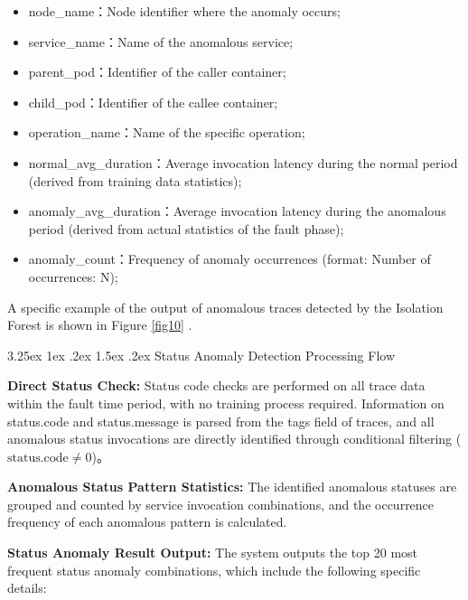 \documentclass[10pt]{article}
\makeatletter
\let\oldref\ref
\renewcommand{\ref}[1]{%
    \textcolor{blue}{\oldref{#1}}%
}
\renewcommand{\paragraph}{%
    \@startsection{paragraph}{4}{\z@}%
    {3.25ex \@plus1ex \@minus.2ex}%
    {1.5ex \@plus.2ex}%
    {\normalfont\normalsize\itshape}%
}
\makeatother
\begin{document}
\begin{itemize}
    \item node\_name：Node identifier where the anomaly occurs;
    \item service\_name：Name of the anomalous service;
    \item parent\_pod：Identifier of the caller container;
    \item child\_pod：Identifier of the callee container;
    \item operation\_name：Name of the specific operation;
    \item normal\_avg\_duration：Average invocation latency during the normal period (derived from training data statistics);
    \item anomaly\_avg\_duration：Average invocation latency during the anomalous period (derived from actual statistics of the fault phase);
    \item anomaly\_count：Frequency of anomaly occurrences (format: Number of occurrences: N);
\end{itemize}

A specific example of the output of anomalous traces detected by the Isolation Forest is shown in Figure \ref{fig10}.

\paragraph{Status Anomaly Detection Processing Flow}

\textbf{Direct Status Check:} Status code checks are performed on all trace data within the fault time period, with no training process required. Information on status.code and status.message is parsed from the tags field of traces, and all anomalous status invocations are directly identified through conditional filtering (\( \text{status.code} \neq 0 \))。

\textbf{Anomalous Status Pattern Statistics:} The identified anomalous statuses are grouped and counted by service invocation combinations, and the occurrence frequency of each anomalous pattern is calculated.

\textbf{Status Anomaly Result Output:} The system outputs the top 20 most frequent status anomaly combinations, which include the following specific details:
\end{document}
